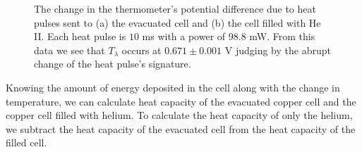\begin{figure}[h!]
\begin{center}
\hspace{-1mm}
\vspace{-2mm}
\vspace{-2mm}
\caption{\small{The change in the thermometer's potential difference due to heat pulses sent to (a) the evacuated cell and (b) the cell filled with He II.  Each heat pulse is $10$ ms with a power of $98.8$ mW.  From this data we see that $T_{\lambda}$ occurs at $0.671 \pm 0.001$ V judging by the abrupt change of the heat pulse's signature.}}
\label{fig:rawdata}
\end{center}
\end{figure}

Knowing the amount of energy deposited in the cell along with the change in temperature, we can calculate heat capacity of the evacuated copper cell and the copper cell filled with helium. To calculate the heat capacity of only the helium, we subtract the heat capacity of the evacuated cell from the heat capacity of the filled cell.